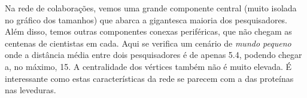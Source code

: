 \documentclass{homework}
\begin{document}
	Na rede de colaborações, vemos uma grande componente central (muito isolada no gráfico dos tamanhos) que abarca a gigantesca maioria dos pesquisadores. Além disso, temos outras componentes conexas periféricas, que não chegam as centenas de cientistas em cada. Aqui se verifica um cenário de \textit{mundo pequeno} onde a distância média entre dois pesquisadores é de apenas 5.4, podendo chegar a, no máximo, 15. A centralidade dos vértices também não é muito elevada. É interessante como estas características da rede se parecem com a das proteínas nas leveduras.

	{}
	
\end{document}
